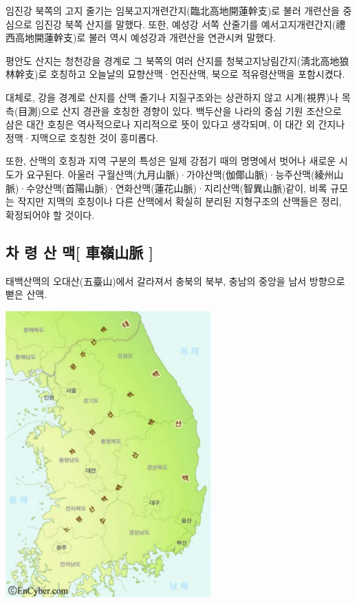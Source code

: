 \documentclass[12pt,a4paper]{book}
\begin{document}
임진강 북쪽의 고지 줄기는 임북고지개련간지(臨北高地開蓮幹支)로 불러 개련산을 중심으로 임진강 북쪽 산지를 말했다. 또한, 예성강 서쪽 산줄기를 예서고지개련간지(禮西高地開蓮幹支)로 불러 역시 예성강과 개련산을 연관시켜 말했다.

평안도 산지는 청천강을 경계로 그 북쪽의 여러 산지를 청북고지낭림간지(淸北高地狼林幹支)로 호칭하고 오늘날의 묘향산맥·언진산맥, 북으로 적유령산맥을 포함시켰다.

대체로, 강을 경계로 산지를 산맥 줄기나 지질구조와는 상관하지 않고 시계(視界)나 목측(目測)으로 산지 경관을 호칭한 경향이 있다. 백두산을 나라의 중심 기원 조산으로 삼은 대간 호칭은 역사적으로나 지리적으로 뜻이 있다고 생각되며, 이 대간 외 간지나 정맥·지맥으로 호칭한 것이 흥미롭다.

또한, 산맥의 호칭과 지역 구분의 특성은 일제 강점기 때의 명명에서 벗어나 새로운 시도가 요구된다. 아울러 구월산맥(九月山脈)·가야산맥(伽倻山脈)·능주산맥(綾州山脈)·수양산맥(首陽山脈)·연화산맥(蓮花山脈)·지리산맥(智異山脈)같이, 비록 규모는 작지만 지맥의 호칭이나 다른 산맥에서 확실히 분리된 지형구조의 산맥들은 정리, 확정되어야 할 것이다.




		\newpage  \null
		\subsection{차 령 산 맥[ 車嶺山脈 ] }
		\null



			태백산맥의 오대산(五臺山)에서 갈라져서 충북의 북부, 충남의 중앙을 남서 방향으로 뻗은 산맥.  

				\includegraphics[width=0.6\textwidth]{./fig/fig__124.pdf}
\end{document}
